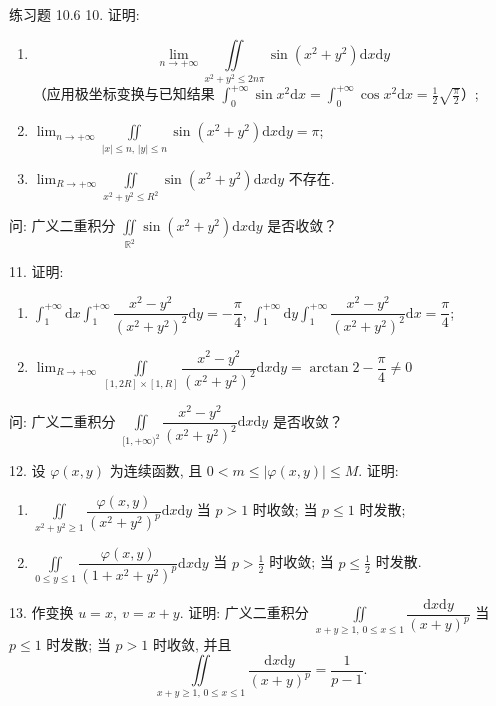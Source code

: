 \begin{exblock}{练习题 10.6}
10. 证明:
\begin{enumerate}
\item[(1)]
\[
\lim_{n \to +\infty} \iint\limits_{x^{2}+y^{2} \leqslant 2n\pi}
\sin(x^{2}+y^{2}) \mathrm{d}x \mathrm{d}y
\]
（应用极坐标变换与已知结果
$\int_{0}^{+\infty} \sin x^{2} \mathrm{d}x = \int_{0}^{+\infty} \cos x^{2} \mathrm{d}x
= \frac{1}{2}\sqrt{\frac{\pi}{2}}$）;
\item[(2)] $\displaystyle \lim_{n \to +\infty} \iint\limits_{|x| \leqslant n,\, |y| \leqslant n}
\sin(x^{2}+y^{2}) \mathrm{d}x\mathrm{d}y = \pi$;
\item[(3)] $\displaystyle \lim_{R \to +\infty} \iint\limits_{x^{2}+y^{2} \leqslant R^{2}}
\sin(x^{2}+y^{2}) \mathrm{d}x \mathrm{d}y$ 不存在.
\end{enumerate}
问: 广义二重积分 $\iint\limits_{\mathbb{R}^{2}} \sin(x^{2}+y^{2}) \mathrm{d}x\mathrm{d}y$ 是否收敛？

11. 证明:
\begin{enumerate}
\item[(1)] $\displaystyle \int_{1}^{+\infty} \mathrm{d}x \int_{1}^{+\infty}
\dfrac{x^{2}-y^{2}}{(x^{2}+y^{2})^{2}} \mathrm{d}y = -\dfrac{\pi}{4}$, \qquad
$\displaystyle \int_{1}^{+\infty} \mathrm{d}y \int_{1}^{+\infty}
\dfrac{x^{2}-y^{2}}{(x^{2}+y^{2})^{2}} \mathrm{d}x = \dfrac{\pi}{4}$;
\item[(2)] $\displaystyle \lim_{R \to +\infty} \iint\limits_{[1,2R] \times [1,R]}
\dfrac{x^{2}-y^{2}}{(x^{2}+y^{2})^{2}} \mathrm{d}x\mathrm{d}y
= \arctan 2 - \dfrac{\pi}{4} \neq 0$
\end{enumerate}
问: 广义二重积分
$\iint\limits_{[1,+\infty)^{2}} \dfrac{x^{2}-y^{2}}{(x^{2}+y^{2})^{2}} \mathrm{d}x\mathrm{d}y$ 是否收敛？

12. 设 $\varphi(x,y)$ 为连续函数, 且 $0 < m \leqslant |\varphi(x,y)| \leqslant M$. 证明:
\begin{enumerate}
\item[(1)] $\iint\limits_{x^{2}+y^{2} \geqslant 1} \dfrac{\varphi(x,y)}{(x^{2}+y^{2})^{p}} \mathrm{d}x\mathrm{d}y$
当 $p > 1$ 时收敛; 当 $p \leqslant 1$ 时发散;
\item[(2)] $\iint\limits_{0 \leqslant y \leqslant 1} \dfrac{\varphi(x,y)}{(1+x^{2}+y^{2})^{p}} \mathrm{d}x\mathrm{d}y$
当 $p > \frac{1}{2}$ 时收敛; 当 $p \leqslant \frac{1}{2}$ 时发散.
\end{enumerate}

13. 作变换 $u = x,\ v = x + y$. 证明: 广义二重积分
$\iint\limits_{x+y \geqslant 1,\, 0 \leqslant x \leqslant 1} \dfrac{\mathrm{d}x\mathrm{d}y}{(x+y)^{p}}$
当 $p \leqslant 1$ 时发散; 当 $p > 1$ 时收敛, 并且
\[
\iint\limits_{x+y \geqslant 1,\, 0 \leqslant x \leqslant 1}
\dfrac{\mathrm{d}x\mathrm{d}y}{(x+y)^{p}} = \frac{1}{p-1}.
\]


\end{exblock}
